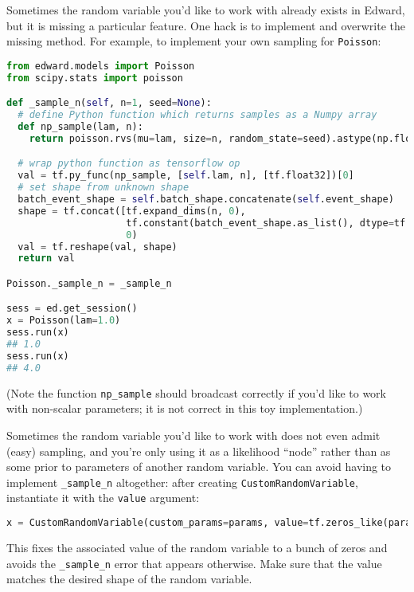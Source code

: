 Sometimes the random variable you'd like to work with already exists
in Edward, but it is missing a particular feature. One hack is to
implement and overwrite the missing method. For example, to implement
your own sampling for \texttt{Poisson}:

\begin{lstlisting}[language=Python]
from edward.models import Poisson
from scipy.stats import poisson

def _sample_n(self, n=1, seed=None):
  # define Python function which returns samples as a Numpy array
  def np_sample(lam, n):
    return poisson.rvs(mu=lam, size=n, random_state=seed).astype(np.float32)

  # wrap python function as tensorflow op
  val = tf.py_func(np_sample, [self.lam, n], [tf.float32])[0]
  # set shape from unknown shape
  batch_event_shape = self.batch_shape.concatenate(self.event_shape)
  shape = tf.concat([tf.expand_dims(n, 0),
                     tf.constant(batch_event_shape.as_list(), dtype=tf.int32)],
                     0)
  val = tf.reshape(val, shape)
  return val

Poisson._sample_n = _sample_n

sess = ed.get_session()
x = Poisson(lam=1.0)
sess.run(x)
## 1.0
sess.run(x)
## 4.0
\end{lstlisting}

(Note the function \texttt{np_sample} should broadcast correctly if
you'd like to work with non-scalar parameters; it is not correct in
this toy implementation.)

Sometimes the random variable you'd like to work with does not even
admit (easy) sampling, and you're only using it as a likelihood ``node'' rather
than as some prior to parameters of another random variable.
You can avoid having to implement \texttt{_sample_n} altogether:
after creating \texttt{CustomRandomVariable}, instantiate it with the
\texttt{value} argument:

\begin{lstlisting}[language=Python]
x = CustomRandomVariable(custom_params=params, value=tf.zeros_like(params))
\end{lstlisting}

This fixes the associated value of the random variable to a bunch of
zeros and avoids the \texttt{_sample_n} error that appears otherwise.
Make sure that the value matches the desired shape of the random
variable.
